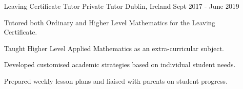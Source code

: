 \begin{cventries}
\cventry
  {Leaving Certificate Tutor} %
  {Private Tutor} %
  {Dublin, Ireland} %
  {Sept 2017 - June 2019} %
  {
    \begin{cvitems}
      \item {Tutored both Ordinary and Higher Level Mathematics for the Leaving Certificate.}
      \item {Taught Higher Level Applied Mathematics as an extra-curricular subject.}
      \item {Developed customised academic strategies based on individual student needs.}
      \item {Prepared weekly lesson plans and liaised with parents on student progress.}
    \end{cvitems}
  }

\end{cventries}